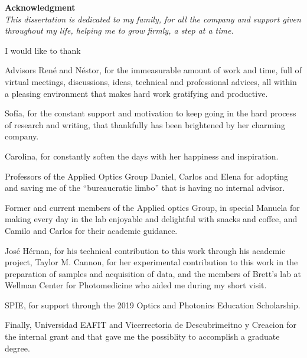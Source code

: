 \newcommand \agradecimientos{

\phantomsection
\addcontentsline{toc}{chapter}{\bf ACKNOWLEDGMENT}

    \begin{flushright}
{\bfseries \Large Acknowledgment} \\

\vspace{2\baselineskip}
\textit{ This dissertation is dedicated to my family, for all the company and support given throughout my life, helping me to grow firmly, a step at a time.}\\
    \end{flushright}	

\vspace{2\baselineskip}
\noindent I would like to thank

Advisors René and Néstor, for the immeasurable amount of work and time, full of virtual meetings, discussions, ideas, technical and professional advices, all within a pleasing environment that makes hard work gratifying and productive.

Sofía, for the constant support and motivation to keep going in the hard process of research and writing, that thankfully has been brightened by her charming company.

Carolina, for constantly soften the days with her happiness and inspiration.

Professors of the Applied Optics Group Daniel, Carlos and Elena for adopting and saving me of the ``bureaucratic limbo'' that is having no internal advisor.

Former and current members of the Applied optics Group, in special Manuela for making every day in the lab enjoyable and delightful with snacks and coffee, and Camilo and Carlos for their academic guidance.

José Hérnan, for his technical contribution to this work through his academic project, Taylor M. Cannon, for her experimental contribution to this work in the preparation of samples and acquisition of data, and the members of Brett's lab at Wellman Center for Photomedicine who aided me during my short visit.

SPIE, for support through the 2019 Optics and Photonics Education Scholarship.

Finally, Universidad EAFIT and Vicerrectoria de Descubrimeitno y Creacion for the internal grant and that gave me the possiblity to accomplish a graduate degree. 

}

\contraportada
\thispagestyle{empty}
\newpage\null\thispagestyle{empty}\newpage

\portada 
\thispagestyle{empty}
\newpage\null\thispagestyle{empty}\newpage


\dedicatoria
\newpage\null\thispagestyle{empty}\newpage

\thispagestyle{empty}
\newpage
\agradecimientos

